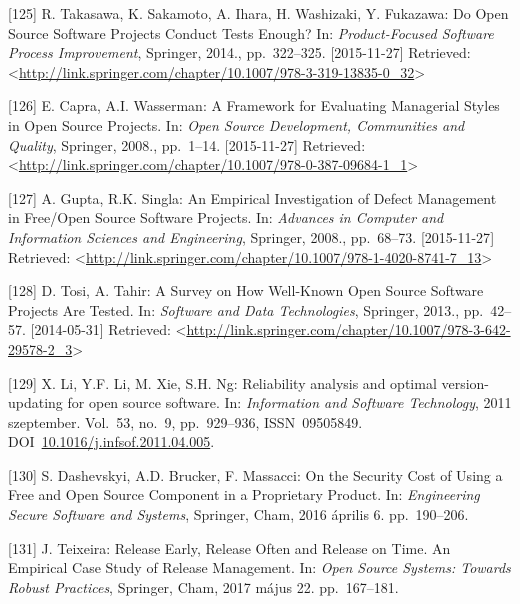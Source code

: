 \documentclass[12pt,magyar,a4paper,oneside]{scrreprt}
\begin{document}
\leavevmode\hypertarget{ref-takasawa_open_2014}{}%
{[}125{]} R. Takasawa, K. Sakamoto, A. Ihara, H. Washizaki, Y. Fukazawa:
Do Open Source Software Projects Conduct Tests Enough? In:
\emph{Product-Focused Software Process Improvement}, Springer, 2014.,
pp.~322--325. {[}2015-11-27{]} Retrieved:
\textless{}\url{http://link.springer.com/chapter/10.1007/978-3-319-13835-0_32}\textgreater{}

\leavevmode\hypertarget{ref-capra_framework_2008}{}%
{[}126{]} E. Capra, A.I. Wasserman: A Framework for Evaluating
Managerial Styles in Open Source Projects. In: \emph{Open Source
Development, Communities and Quality}, Springer, 2008., pp.~1--14.
{[}2015-11-27{]} Retrieved:
\textless{}\url{http://link.springer.com/chapter/10.1007/978-0-387-09684-1_1}\textgreater{}

\leavevmode\hypertarget{ref-gupta_empirical_2008}{}%
{[}127{]} A. Gupta, R.K. Singla: An Empirical Investigation of Defect
Management in Free/Open Source Software Projects. In: \emph{Advances in
Computer and Information Sciences and Engineering}, Springer, 2008.,
pp.~68--73. {[}2015-11-27{]} Retrieved:
\textless{}\url{http://link.springer.com/chapter/10.1007/978-1-4020-8741-7_13}\textgreater{}

\leavevmode\hypertarget{ref-tosi_survey_2013}{}%
{[}128{]} D. Tosi, A. Tahir: A Survey on How Well-Known Open Source
Software Projects Are Tested. In: \emph{Software and Data Technologies},
Springer, 2013., pp.~42--57. {[}2014-05-31{]} Retrieved:
\textless{}\url{http://link.springer.com/chapter/10.1007/978-3-642-29578-2_3}\textgreater{}

\leavevmode\hypertarget{ref-li_reliability_2011}{}%
{[}129{]} X. Li, Y.F. Li, M. Xie, S.H. Ng: Reliability analysis and
optimal version-updating for open source software. In: \emph{Information
and Software Technology}, 2011 szeptember. Vol.~53, no.~9, pp.~929--936,
ISSN~09505849.
DOI~\href{https://doi.org/10.1016/j.infsof.2011.04.005}{10.1016/j.infsof.2011.04.005}.

\leavevmode\hypertarget{ref-dashevskyi_security_2016}{}%
{[}130{]} S. Dashevskyi, A.D. Brucker, F. Massacci: On the Security Cost
of Using a Free and Open Source Component in a Proprietary Product. In:
\emph{Engineering Secure Software and Systems}, Springer, Cham, 2016
április 6. pp.~190--206.

\leavevmode\hypertarget{ref-teixeira_release_2017}{}%
{[}131{]} J. Teixeira: Release Early, Release Often and Release on Time.
An Empirical Case Study of Release Management. In: \emph{Open Source
Systems: Towards Robust Practices}, Springer, Cham, 2017 május 22.
pp.~167--181.
\end{document}
